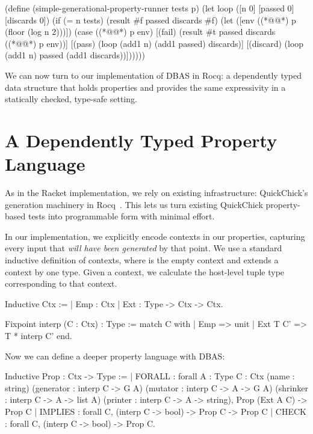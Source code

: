 \begin{code}[language=Racket,escapeinside={(*@}{@*)}]
(define (simple-generational-property-runner tests p)
  (let loop ([n 0] [passed 0] [discards 0])
    (if (= n tests)
        (result #f passed discards #f)
        (let ([env ((*@@*) p (floor (log n 2)))])
          (case ((*@@*) p env)
            [(fail) (result #t passed discards ((*@@*) p env))]
            [(pass) (loop (add1 n) (add1 passed) discards)]
            [(discard) (loop (add1 n) passed (add1 discards))])))))
\end{code}

We can now turn to our implementation of DBAS in Rocq: a dependently typed data
structure that holds properties and provides the same expressivity in a statically
checked, type-safe setting.

\section{A Dependently Typed Property Language}\label{sec:rocq}

As in the Racket implementation, we rely on existing infrastructure: QuickChick's
generation machinery in Rocq~\cite{LeoThesis2018}. This lets us turn existing
QuickChick property-based tests into programmable form with minimal effort.

In our implementation, we explicitly encode contexts in our properties, capturing every
input that \emph{will have been generated} by that point. We use a standard inductive
definition of contexts, where  is the empty context and
 extends a context by one type. Given a context, we calculate
the host-level tuple type corresponding to that context.

\begin{code}[language=Rocq]
Inductive Ctx :=
| Emp : Ctx
| Ext : Type -> Ctx -> Ctx.
\end{code}

\begin{code}[language=Rocq]
Fixpoint interp (C : Ctx) : Type :=
  match C with
  | Emp => unit
  | Ext T C' => T * interp C'
  end.
\end{code}

Now we can define a deeper property language with DBAS:

\begin{code}[language=Rocq]
Inductive Prop : Ctx -> Type :=
| FORALL : forall {A : Type} {C : Ctx} (name : string)
      (generator : interp C -> G A)
      (mutator   : interp C -> A -> G A)
      (shrinker  : interp C -> A -> list A)
      (printer   : interp C -> A -> string),
      Prop (Ext A C) -> Prop C
| IMPLIES : forall C,
      (interp C -> bool) -> Prop C -> Prop C
| CHECK : forall C,
      (interp C -> bool) -> Prop C.
\end{code}

